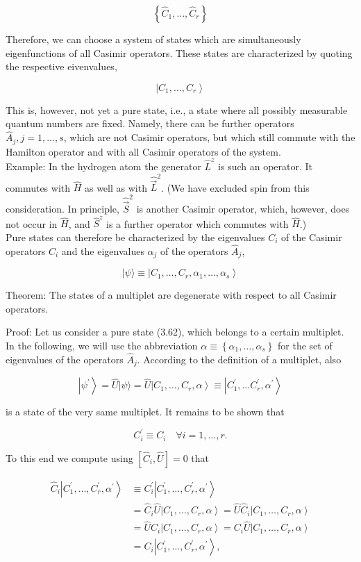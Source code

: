 \documentclass[10pt, letterpaper]{article}
\begin{document}
$$
\left\{\hat{C}_{1}, \ldots, \hat{C}_{r}\right\}
$$

Therefore, we can choose a system of states which are simultaneously eigenfunctions of all Casimir operators. These states are characterized by quoting the respective eivenvalues,

$$
\left|C_{1}, \ldots, C_{r}\right\rangle
$$

This is, however, not yet a pure state, i.e., a state where all possibly measurable quantum numbers are fixed. Namely, there can be further operators $\hat{A}_{j}, j=1, \ldots, s$, which are not Casimir operators, but which still commute with the Hamilton operator and with all Casimir operators of the system.\\
Example: In the hydrogen atom the generator $\hat{L}^{z}$ is such an operator. It commutes with $\hat{H}$ as well as with $\hat{\vec{L}}^{2}$. (We have excluded spin from this consideration. In principle, $\hat{\vec{S}}^{2}$ is another Casimir operator, which, however, does not occur in $\hat{H}$, and $\hat{S}^{z}$ is a further operator which commutes with $\hat{H}$.)\\
Pure states can therefore be characterized by the eigenvalues $C_{i}$ of the Casimir operators $\hat{C}_{i}$ and the eigenvalues $\alpha_{j}$ of the operators $\hat{A}_{j}$,

$$
|\psi\rangle \equiv\left|C_{1}, \ldots, C_{r}, \alpha_{1}, \ldots, \alpha_{s}\right\rangle
$$

Theorem: The states of a multiplet are degenerate with respect to all Casimir operators.

Proof: Let us consider a pure state (3.62), which belongs to a certain multiplet. In the following, we will use the abbreviation $\alpha \equiv\left\{\alpha_{1}, \ldots, \alpha_{s}\right\}$ for the set of eigenvalues of the operators $\hat{A}_{j}$. According to the definition of a multiplet, also

$$
\left|\psi^{\prime}\right\rangle=\hat{U}|\psi\rangle=\hat{U}\left|C_{1}, \ldots, C_{r}, \alpha\right\rangle \equiv\left|C_{1}^{\prime}, \ldots C_{r}^{\prime}, \alpha^{\prime}\right\rangle
$$

is a state of the very same multiplet. It remains to be shown that

$$
C_{i}^{\prime} \equiv C_{i} \quad \forall i=1, \ldots, r .
$$

To this end we compute using $\left[\hat{C}_{i}, \hat{U}\right]=0$ that

$$
\begin{aligned}
\hat{C}_{i}\left|C_{1}^{\prime}, \ldots, C_{r}^{\prime}, \alpha^{\prime}\right\rangle & \equiv C_{i}^{\prime}\left|C_{1}^{\prime}, \ldots, C_{r}^{\prime}, \alpha^{\prime}\right\rangle \\
& =\hat{C}_{i} \hat{U}\left|C_{1}, \ldots, C_{r}, \alpha\right\rangle=\hat{U} \hat{C}_{i}\left|C_{1}, \ldots, C_{r}, \alpha\right\rangle \\
& =\hat{U} C_{i}\left|C_{1}, \ldots, C_{r}, \alpha\right\rangle=C_{i} \hat{U}\left|C_{1}, \ldots, C_{r}, \alpha\right\rangle \\
& =C_{i}\left|C_{1}^{\prime}, \ldots, C_{r}^{\prime}, \alpha^{\prime}\right\rangle,
\end{aligned}
$$
\end{document}

